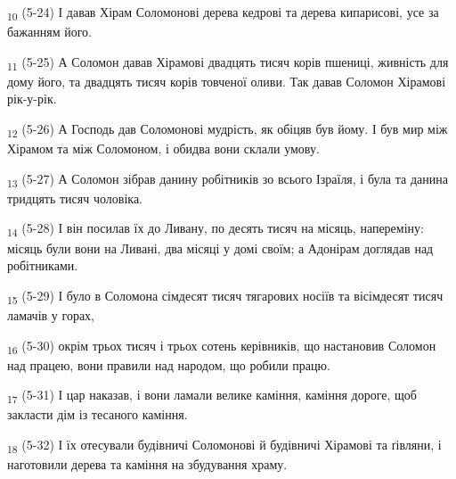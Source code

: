 \begin{tcolorbox}
\textsubscript{10} (5-24) І давав Хірам Соломонові дерева кедрові та дерева кипарисові, усе за бажанням його.
\end{tcolorbox}
\begin{tcolorbox}
\textsubscript{11} (5-25) А Соломон давав Хірамові двадцять тисяч корів пшениці, живність для дому його, та двадцять тисяч корів товченої оливи. Так давав Соломон Хірамові рік-у-рік.
\end{tcolorbox}
\begin{tcolorbox}
\textsubscript{12} (5-26) А Господь дав Соломонові мудрість, як обіцяв був йому. І був мир між Хірамом та між Соломоном, і обидва вони склали умову.
\end{tcolorbox}
\begin{tcolorbox}
\textsubscript{13} (5-27) А Соломон зібрав данину робітників зо всього Ізраїля, і була та данина тридцять тисяч чоловіка.
\end{tcolorbox}
\begin{tcolorbox}
\textsubscript{14} (5-28) І він посилав їх до Ливану, по десять тисяч на місяць, напереміну: місяць були вони на Ливані, два місяці у домі своїм; а Адонірам доглядав над робітниками.
\end{tcolorbox}
\begin{tcolorbox}
\textsubscript{15} (5-29) І було в Соломона сімдесят тисяч тягарових носіїв та вісімдесят тисяч ламачів у горах,
\end{tcolorbox}
\begin{tcolorbox}
\textsubscript{16} (5-30) окрім трьох тисяч і трьох сотень керівників, що настановив Соломон над працею, вони правили над народом, що робили працю.
\end{tcolorbox}
\begin{tcolorbox}
\textsubscript{17} (5-31) І цар наказав, і вони ламали велике каміння, каміння дороге, щоб закласти дім із тесаного каміння.
\end{tcolorbox}
\begin{tcolorbox}
\textsubscript{18} (5-32) І їх отесували будівничі Соломонові й будівничі Хірамові та ґівляни, і наготовили дерева та каміння на збудування храму.
\end{tcolorbox}
